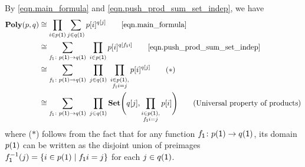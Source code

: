 \documentclass[Book-Poly]{subfiles}
\begin{document}
\begin{exercise}
\begin{solution}
\begin{longenum}
\item By \eqref{eqn.main_formula} and \eqref{eqn.push_prod_sum_set_indep}, we have
\begin{align*}
    \poly(p, q) &\iso \prod_{i \in p(\1)} \sum_{j \in q(\1)} p[i]^{q[j]} \tag*{\eqref{eqn.main_formula}} \\
    &\iso \sum_{f_\1 \colon p(\1) \to q(\1)} \; \prod_{i \in p(\1)} p[i]^{q[f_\1i]} \tag*{\eqref{eqn.push_prod_sum_set_indep}} \\
    &\iso \sum_{f_\1 \colon p(\1) \to q(\1)} \; \prod_{j \in q(\1)} \; \prod_{\substack{i \in p(\1), \\ f_\1i = j}} p[i]^{q[j]} \tag{$\ast$} \\
    &\iso \sum_{f_\1\colon p(\1)\to q(\1)} \; \prod_{j\in q(\1)}\smset\Bigg(q[j],\prod_{\substack{i \in p(\1), \\ f_\1i = j}}p[i]\Bigg) \tag{Universal property of products}
\end{align*}
where ($\ast$) follows from the fact that for any function $f_{\textsf{1}}\colon p(\textsf{1})\to q(\textsf{1})$, its domain $p(\textsf{1})$ can be written as the disjoint union of preimages $f_{\textsf{1}}^{-1}(j) = \{i \in p(1) \mid f_{\textsf{1}}i = j\}$ for each $j \in q(\textsf{1})$.


\end{longenum}
\end{solution}
\end{exercise}
\end{document}
